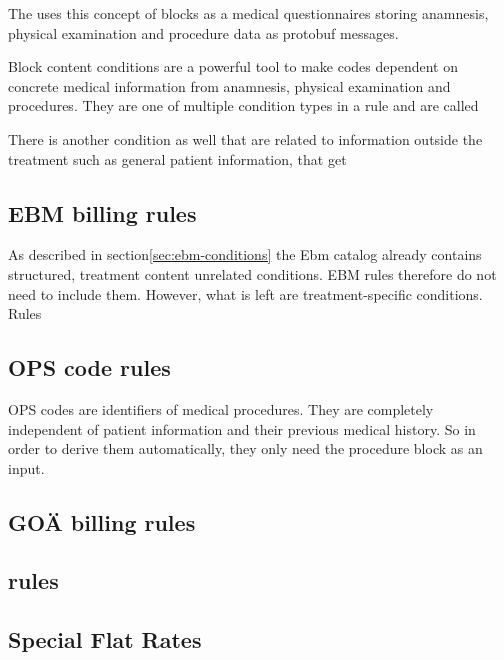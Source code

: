 The \AVS uses this concept of blocks as a medical questionnaires storing anamnesis, physical examination and procedure
data as protobuf messages.

Block content conditions are a powerful tool to make codes dependent on concrete medical information from anamnesis,
physical examination and procedures.
They are one of multiple condition types in a rule and are called 


There is another condition
as well that are related to information outside the treatment such as general patient information,
that get

\subsection{EBM billing rules}\label{subsec:ebm-billing-rules}
As described in section\ref{sec:ebm-conditions} the Ebm catalog already contains structured,
treatment content unrelated conditions.
EBM rules therefore do not need to include them.
However, what is left are treatment-specific conditions.
Rules

\subsection{OPS code rules}\label{subsec:ops-code-rules}
OPS codes are identifiers of medical procedures.
They are completely independent of patient information and their previous medical history.
So in order to derive them automatically, they only need the procedure block as an input.

\subsection{GOÄ billing rules}\label{subsec:goa-billing-rules}

\subsection{\MJ rules}\label{subsec:multiplier-justification-rules}

\subsection{Special Flat Rates}\label{subsec:special-flat-rates}

